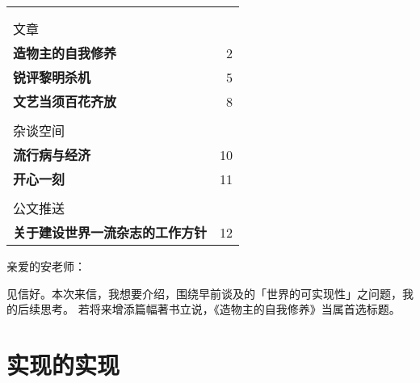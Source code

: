 \noindent\begin{minipage}{\linewidth}
	\vspace{20mm}\par
	\center
	\par

	\tabcolsep=0pt
	\renewcommand{\arraystretch}{1.3}
	\noindent\begin{tabular}{lr}
		{\hspace{140mm}}                        & {} \\
		{}                                      & {} \\
		{\footnotesize\sffamily 文章}           & {} \\
		\hline
		\textbf{造物主的自我修养}               & 2  \\
		\textbf{锐评黎明杀机}                   & 5  \\
		\textbf{文艺当须百花齐放}               & 8  \\
		{}                                      & {} \\
		{\footnotesize\sffamily 杂谈空间}       & {} \\
		\hline
		\textbf{流行病与经济}                   & 10 \\
		\textbf{开心一刻}                       & 11 \\
		{}                                      & {} \\
		{\footnotesize\sffamily 公文推送}       & {} \\
		\hline
		\textbf{关于建设世界一流杂志的工作方针} & 12 \\
	\end{tabular}
\end{minipage}









\renewcommand{\fontforsection}[0]{\normalsize\bfseries}


\noindent
亲爱的安老师：

见信好。本次来信，我想要介绍，围绕早前谈及的「世界的可实现性」之问题，我的后续思考。
若将来增添篇幅著书立说，《造物主的自我修养》当属首选标题。

\section{实现的实现}


